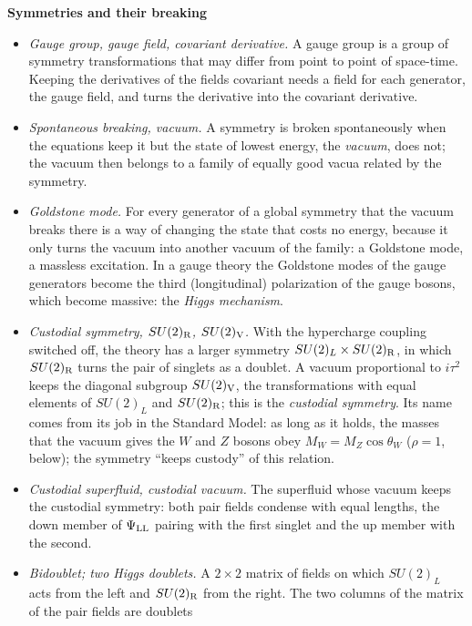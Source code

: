 \documentclass[
  10pt,
]{article}
\providecommand{\tightlist}{%
  \setlength{\itemsep}{0pt}\setlength{\parskip}{0pt}}
\begin{document}
\textbf{Symmetries and their breaking}

\begin{itemize}
\tightlist
\item
  \emph{Gauge group, gauge field, covariant derivative.} A gauge group
  is a group of symmetry transformations that may differ from point to
  point of space-time. Keeping the derivatives of the fields covariant
  needs a field for each generator, the gauge field, and turns the
  derivative into the covariant derivative.
\item
  \emph{Spontaneous breaking, vacuum.} A symmetry is broken
  spontaneously when the equations keep it but the state of lowest
  energy, the \emph{vacuum}, does not; the vacuum then belongs to a
  family of equally good vacua related by the symmetry.
\item
  \emph{Goldstone mode.} For every generator of a global symmetry that
  the vacuum breaks there is a way of changing the state that costs no
  energy, because it only turns the vacuum into another vacuum of the
  family: a Goldstone mode, a massless excitation. In a gauge theory the
  Goldstone modes of the gauge generators become the third
  (longitudinal) polarization of the gauge bosons, which become massive:
  the \emph{Higgs mechanism}.
\item
  \emph{Custodial symmetry, \(SU(2)_{\rm R}\), \(SU(2)_{\rm V}\).} With
  the hypercharge coupling switched off, the theory has a larger
  symmetry \(SU(2)_L\times SU(2)_{\rm R}\), in which \(SU(2)_{\rm R}\)
  turns the pair of singlets as a doublet. A vacuum proportional to
  \(i\tau^2\) keeps the diagonal subgroup \(SU(2)_{\rm V}\), the
  transformations with equal elements of \(SU(2)_L\) and
  \(SU(2)_{\rm R}\); this is the \emph{custodial symmetry}. Its name
  comes from its job in the Standard Model: as long as it holds, the
  masses that the vacuum gives the \(W\) and \(Z\) bosons obey
  \(M_W=M_Z\cos\theta_W\) (\(\rho=1\), below); the symmetry ``keeps
  custody'' of this relation.
\item
  \emph{Custodial superfluid, custodial vacuum.} The superfluid whose
  vacuum keeps the custodial symmetry: both pair fields condense with
  equal lengths, the down member of \(\Psi_{\rm LL}\) pairing with the
  first singlet and the up member with the second.
\item
  \emph{Bidoublet; two Higgs doublets.} A \(2\times2\) matrix of fields
  on which \(SU(2)_L\) acts from the left and \(SU(2)_{\rm R}\) from the
  right. The two columns of the matrix of the pair fields are doublets

\end{itemize}
\end{document}
